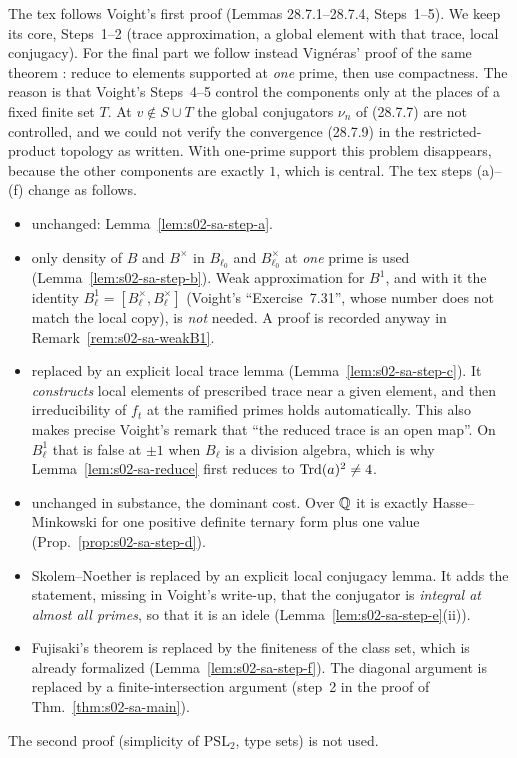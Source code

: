 \begin{remark}\label{rem:s02-sa-route}
The tex follows Voight's first proof  (Lemmas 28.7.1--28.7.4,
Steps~1--5). We keep its core, Steps~1--2 (trace approximation, a global element with that trace, local conjugacy). For the
final part we follow instead Vignéras' proof of the same theorem
: reduce to elements
supported at \emph{one} prime, then use compactness. The reason is that Voight's Steps~4--5 control the components only at the
places of a fixed finite set $T$. At $v\notin S\cup T$ the global conjugators $\nu_n$ of (28.7.7) are not controlled, and we
could not verify the convergence (28.7.9) in the restricted-product topology as written. With one-prime support this problem
disappears, because the other components are exactly $1$, which is central. The tex steps (a)--(f) change as follows.
\begin{itemize}
\item[(a)] unchanged: Lemma~\ref{lem:s02-sa-step-a}.
\item[(b)] only density of $B$ and $B^\times$ in $B_{\ell_0}$ and $B_{\ell_0}^\times$ at \emph{one} prime is used
  (Lemma~\ref{lem:s02-sa-step-b}). Weak approximation for $B^1$, and with it the identity $B^1_\ell=[B^\times_\ell,B^\times_\ell]$
  (Voight's ``Exercise~7.31'', whose number does not match the local copy), is \emph{not} needed. A proof is recorded anyway in
  Remark~\ref{rem:s02-sa-weakB1}.
\item[(c)] replaced by an explicit local trace lemma (Lemma~\ref{lem:s02-sa-step-c}). It \emph{constructs} local elements of
  prescribed trace near a given element, and then irreducibility of $f_t$ at the ramified primes holds automatically. This also
  makes precise Voight's remark that ``the reduced trace is an open map''. On $B_\ell^1$ that is false at $\pm1$ when $B_\ell$ is
  a division algebra, which is why Lemma~\ref{lem:s02-sa-reduce} first reduces to $\mathrm{Trd}(a)^2\ne4$.
\item[(d)] unchanged in substance, the dominant cost. Over $\mathbb{Q}$ it is exactly Hasse--Minkowski for one positive definite ternary
  form plus one value (Prop.~\ref{prop:s02-sa-step-d}).
\item[(e)] Skolem--Noether is replaced by an explicit local conjugacy lemma. It adds the statement, missing in Voight's write-up,
  that the conjugator is \emph{integral at almost all primes}, so that it is an idele (Lemma~\ref{lem:s02-sa-step-e}(ii)).
\item[(f)] Fujisaki's theorem is replaced by the finiteness of the class set, which is already formalized
  (Lemma~\ref{lem:s02-sa-step-f}). The diagonal argument is replaced by a finite-intersection argument (step~2 in the proof of
  Thm.~\ref{thm:s02-sa-main}).
\end{itemize}
The second proof  (simplicity of $\mathrm{PSL}_2$, type sets) is not used.
\end{remark}

